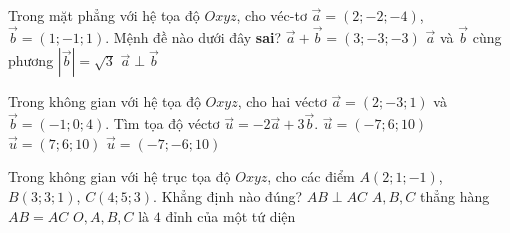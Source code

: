 \begin{ex}%
	Trong mặt phẳng với hệ tọa độ $Oxyz$, cho véc-tơ $\vec{a}=(2;-2;-4)$, $\vec{b}=(1;-1;1)$. Mệnh đề nào dưới đây {\bf sai}?
	\choice
	{$\vec{a}+\vec{b}=(3;-3;-3)$}
	{\True $\vec{a}$ và $\vec{b}$ cùng phương}
	{$\left|\vec{b}\right| =\sqrt{3}$}
	{$\vec{a} \perp \vec{b}$}	
\end{ex}
\begin{ex}%
	Trong không gian với hệ tọa độ $Oxyz$, cho hai véctơ $\overrightarrow{a}=(2;-3;1)$ và $\overrightarrow{b}=(-1;0;4)$. Tìm tọa độ véctơ $\overrightarrow{u}=-2\overrightarrow{a}+3\overrightarrow{b}$.
	{\True $\overrightarrow{u}=(-7;6;10)$}
	{$\overrightarrow{u}=(7;6;10)$}
	{$\overrightarrow{u}=(-7;-6;10)$}
\end{ex}
\begin{ex}%
	Trong không gian với hệ trục tọa độ $Oxyz$, cho các điểm $A\left(2; 1; -1\right)$, $B\left(3; 3; 1\right)$, $C\left(4; 5; 3\right)$. Khẳng định nào đúng?
	\choice
	{$AB\perp AC$}
	{\True $A, B, C$ thẳng hàng}
	{$AB = AC$}
	{$O, A, B, C$ là $4$ đỉnh của một tứ diện}
\end{ex}
